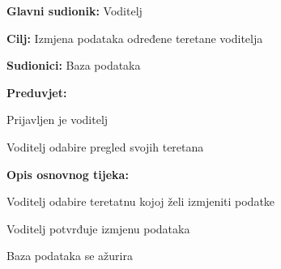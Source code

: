 					\noindent {}
					\begin{packed_item}
	
						\item \textbf{Glavni sudionik: } Voditelj
						\item  \textbf{Cilj:} Izmjena podataka određene teretane voditelja
						\item  \textbf{Sudionici:} Baza podataka
						\item  \textbf{Preduvjet:}
						\item[] \begin{packed_enum}
	
							\item Prijavljen je voditelj 
							\item Voditelj odabire pregled svojih teretana

						\end{packed_enum}
						\item  \textbf{Opis osnovnog tijeka:}
						
						\item[] \begin{packed_enum}
	
							\item Voditelj odabire teretatnu kojoj želi izmjeniti podatke
							\item Voditelj potvrđuje izmjenu podataka
							\item Baza podataka se ažurira
						\end{packed_enum}
						
						
					\end{packed_item}
					
